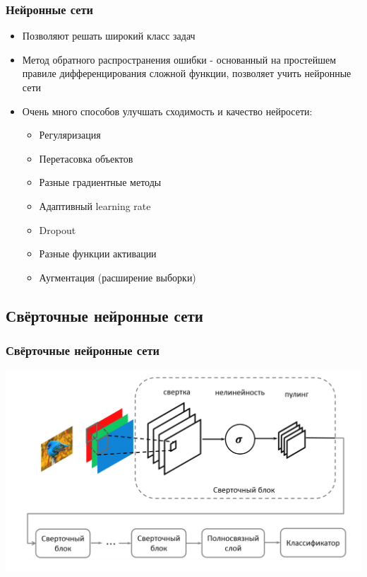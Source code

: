 \documentclass{beamer}
\begin{document}
\begin{frame}
\frametitle{Нейронные сети}
\pause
\begin{itemize}
\item Позволяют решать широкий класс задач\pause
\item Метод обратного распространения ошибки - основанный на простейшем правиле дифференцирования сложной функции, позволяет учить нейронные сети\pause
\item Очень много способов улучшать сходимость и качество нейросети:\pause
\begin{itemize}
\item Регуляризация\pause
\item Перетасовка объектов\pause
\item Разные градиентные методы\pause
\item Адаптивный learning rate\pause
\item Dropout\pause
\item Разные функции активации\pause
\item Аугментация (расширение выборки)\pause
\end{itemize}
\end{itemize}
\end{frame}

\subsection{Свёрточные нейронные сети}
\begin{frame}
\frametitle{Свёрточные нейронные сети}\begin{center}
\includegraphics[scale=0.3]{convolutional_nn.png}
\end{center}
\end{frame}
\end{document}
